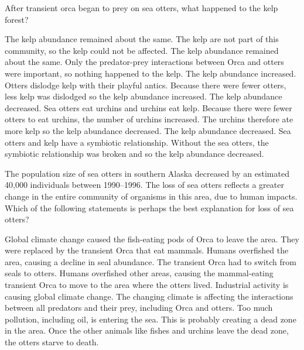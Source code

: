 \question
After transient orca began to prey on sea otters, what happened to the kelp forest?

\begin{choices}
\choice The kelp abundance remained about the same. The kelp are not part of this community, so the kelp could not be affected.%
\choice The kelp abundance remained about the same. Only the predator-prey interactions between Orca and otters were important, so nothing happened to the kelp.%
\choice The kelp abundance increased. Otters dislodge kelp with their playful antics.  Because there were fewer otters, less kelp was dislodged so the kelp abundance increased.%
\correctchoice The kelp abundance decreased. Sea otters eat urchins and urchins eat kelp.  Because there were fewer otters to eat urchins, the number of urchins increased.  The urchins therefore ate more kelp so the kelp abundance decreased.%
\choice The kelp abundance decreased. Sea otters and kelp have a symbiotic relationship. Without the sea otters, the symbiotic relationship was broken and so the kelp abundance decreased.%
\end{choices}


\question
The population size of sea otters in southern Alaska decreased by an estimated 40,000 individuals between 1990--1996. The loss of sea otters reflects a greater change in the entire community of organisms in this area, due to human impacts. Which of the following statements is perhaps the best explanation for loss of sea otters?

\begin{choices}
\choice Global climate change caused the fish-eating pods of Orca to leave the area. They were replaced by the transient Orca that eat mammals.%
\correctchoice Humans overfished the area, causing a decline in seal abundance. The transient Orca had to switch from seals to otters.%
\choice Humans overfished other areas, causing the mammal-eating transient Orca to move to the area where the otters lived.%
\choice Industrial activity is causing global climate change. The changing climate is affecting the interactions between all predators and their prey, including Orca and otters.%
\choice Too much pollution, including oil, is entering the sea. This is probably creating a dead zone in the area. Once the other animals like fishes and urchins leave the dead zone, the otters starve to death.%
\end{choices}


